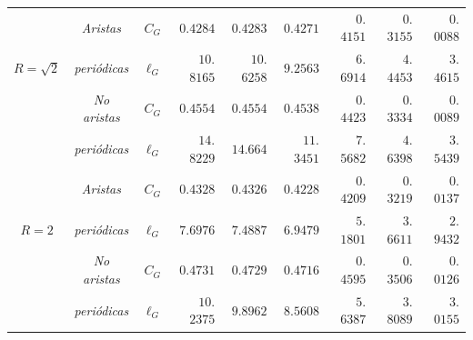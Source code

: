\begin{table}[!ht]
\begin{center}
{\begin{tabular}{|c|c|c|c|c|c|c|c|c|}
 & \emph{Aristas} & $C_G$ & \multicolumn{1}{|r|}{$0$.$4284$} & \multicolumn{1}{|r|}{$0$.$4283$} & \multicolumn{1}{|r|}{$0$.$4271$} & \multicolumn{1}{|r|}{$0$.$4151$} & \multicolumn{1}{|r|}{$0$.$3155$} & \multicolumn{1}{|r|}{$0$.$0088$} \\\cline{3-9}
 
$R=\sqrt{2}$ & \emph{peri\'odicas} & $\ell_G$ & \multicolumn{1}{|r|}{$10$.$8165$} & \multicolumn{1}{|r|}{$10$.$6258$} & \multicolumn{1}{|r|}{$9$.$2563$} & \multicolumn{1}{|r|}{$6$.$6914$} & \multicolumn{1}{|r|}{$4$.$4453$} & \multicolumn{1}{|r|}{$3$.$4615$} \\\cline{2-9}

 & \emph{No aristas} & $C_G$ & \multicolumn{1}{|r|}{$0$.$4554$} & \multicolumn{1}{|r|}{$0$.$4554$} & \multicolumn{1}{|r|}{$0$.$4538$} & \multicolumn{1}{|r|}{$0$.$4423$} & \multicolumn{1}{|r|}{$0$.$3334$} & \multicolumn{1}{|r|}{$0$.$0089$} \\\cline{3-9}

 & \emph{peri\'odicas} & $\ell_G$ & \multicolumn{1}{|r|}{$14$.$8229$} & \multicolumn{1}{|r|}{$14$.$664$} & \multicolumn{1}{|r|}{$11$.$3451$} & \multicolumn{1}{|r|}{$7$.$5682$} & \multicolumn{1}{|r|}{$4$.$6398$} & \multicolumn{1}{|r|}{$3$.$5439$} \\\hline
    
 & \emph{Aristas} & $C_G$ & \multicolumn{1}{|r|}{$0$.$4328$} & \multicolumn{1}{|r|}{$0$.$4326$} & \multicolumn{1}{|r|}{$0$.$4228$} & \multicolumn{1}{|r|}{$0$.$4209$} & \multicolumn{1}{|r|}{$0$.$3219$} & \multicolumn{1}{|r|}{$0$.$0137$} \\\cline{3-9}
 
$R=2$ & \emph{peri\'odicas} & $\ell_G$ & \multicolumn{1}{|r|}{$7$.$6976$} & \multicolumn{1}{|r|}{$7$.$4887$} & \multicolumn{1}{|r|}{$6$.$9479$} & \multicolumn{1}{|r|}{$5$.$1801$} & \multicolumn{1}{|r|}{$3$.$6611$} & \multicolumn{1}{|r|}{$2$.$9432$} \\\cline{2-9}

 & \emph{No aristas} & $C_G$ & \multicolumn{1}{|r|}{$0$.$4731$} & \multicolumn{1}{|r|}{$0$.$4729$} & \multicolumn{1}{|r|}{$0$.$4716$} & \multicolumn{1}{|r|}{$0$.$4595$} & \multicolumn{1}{|r|}{$0$.$3506$} & \multicolumn{1}{|r|}{$0$.$0126$} \\\cline{3-9}
 
 & \emph{peri\'odicas} & $\ell_G$ & \multicolumn{1}{|r|}{$10$.$2375$} & \multicolumn{1}{|r|}{$9$.$8962$} & \multicolumn{1}{|r|}{$8$.$5608$} & \multicolumn{1}{|r|}{$5$.$6387$} & \multicolumn{1}{|r|}{$3$.$8089$} & \multicolumn{1}{|r|}{$3$.$0155$} \\\hline


\end{tabular}}
\end{center}
\end{table}
